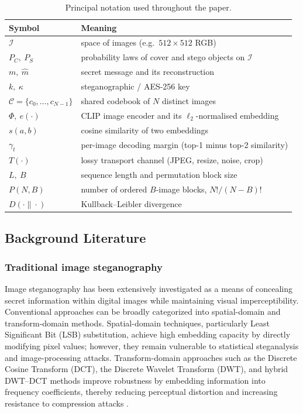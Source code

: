 \documentclass[10pt,a4paper]{article}
\theoremstyle{definition}
\begin{document}
\begin{table}[t]
\centering
\caption{Principal notation used throughout the paper.}\label{tab:notation}
\begin{tabular}{@{}ll@{}}
\toprule
Symbol & Meaning \\
\midrule
$\mathcal{I}$ & space of images (e.g.\ $512{\times}512$ RGB) \\
$P_C,\ P_S$ & probability laws of cover and stego objects on $\mathcal{I}$ \\
$m,\ \hat m$ & secret message and its reconstruction \\
$k,\ \kappa$ & steganographic / AES-256 key \\
$\mathcal{C}=\{c_0,\dots,c_{N-1}\}$ & shared codebook of $N$ distinct images \\
$\Phi,\ e(\cdot)$ & CLIP image encoder and its $\ell_2$-normalised embedding \\
$s(a,b)$ & cosine similarity of two embeddings \\
$\gamma_t$ & per-image decoding margin (top-1 minus top-2 similarity) \\
$T(\cdot)$ & lossy transport channel (JPEG, resize, noise, crop) \\
$L,\ B$ & sequence length and permutation block size \\
$P(N,B)$ & number of ordered $B$-image blocks, $N!/(N-B)!$ \\
$D(\cdot\|\cdot)$ & Kullback--Leibler divergence \\
\bottomrule
\end{tabular}
\end{table}

\subsection{Background Literature}\label{sec:related}

\subsubsection{Traditional image steganography}
Image steganography has been extensively investigated as a means of concealing
secret information within digital images while maintaining visual imperceptibility.
Conventional approaches can be broadly categorized into spatial-domain and
transform-domain methods. Spatial-domain techniques, particularly Least Significant
Bit (LSB) substitution, achieve high embedding capacity by directly modifying pixel
values; however, they remain vulnerable to statistical steganalysis and
image-processing attacks. Transform-domain approaches such as the Discrete Cosine
Transform (DCT), the Discrete Wavelet Transform (DWT), and hybrid DWT--DCT methods
improve robustness by embedding information into frequency coefficients, thereby
reducing perceptual distortion and increasing resistance to compression attacks
\cite{subramanian,kombrink,qin,liSPHCG}.
\end{document}
